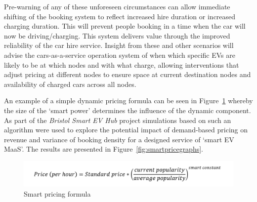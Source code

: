 \documentclass[b5paper,10pt]{article}
\begin{document}
Pre-warning of any of these unforeseen circumstances can allow
immediate shifting of the booking system to reflect increased hire
duration or increased charging duration. This will prevent people
booking in a time when the car will now be driving/charging. This
system delivers value through the improved reliability of the car hire
service. Insight from these and other scenarios will advise the
cars-as-a-service operation system of when which specific EVs are
likely to be at which nodes and with what charge, allowing
interventions that adjust pricing at different nodes to ensure space
at current destination nodes and availability of charged cars across
all nodes.

An example of a simple dynamic pricing formula can be seen in
Figure~\ref{fig:smartpricingformula} whereby the size of the `smart
power' determines the influence of the dynamic component.  As part of
the {\emph{Bristol Smart EV Hub}} project simulations based on such an
algorithm were used to explore the potential impact of demand-based
pricing on revenue and variance of booking density for a designed
service of `smart EV MaaS'. The results are presented in
Figure~\ref{fig:smartpricegraphs}.


\begin{figure}[htb]
\centering
\includegraphics[width=0.75\columnwidth]{images/smartpricingformula.png}
\caption{Smart pricing formula}
\label{fig:smartpricingformula}
\end{figure}

\end{document}

